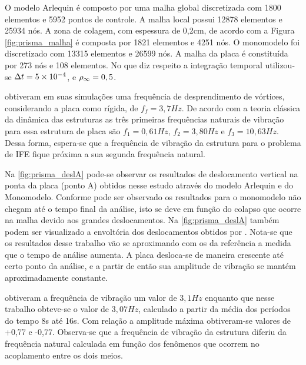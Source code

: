 O modelo Arlequin é composto por uma malha global discretizada com 1800 elementos e 5952 pontos de controle. A malha local possui 12878 elementos e 25934 nós. A zona de colagem, com espessura de 0,2cm, de acordo com a Figura \ref{fig:prisma_malha} é composta por 1821 elementos e 4251 nós.  O monomodelo foi discretizado com 13315 elementos e 26599 nós. A malha da placa é constituída por 273 nós e 108 elementos. No que diz respeito a integração temporal utilizou-se $\Delta t = 5\times10^{-4}$, e $\rho_\infty = 0,5$.

 obtiveram em suas simulações uma frequência de desprendimento de vórtices, considerando a placa como rígida, de $f_f = 3,7Hz$. De acordo com a teoria clássica da dinâmica das estruturas as três primeiras frequências naturais de vibração para essa estrutura de placa são $f_1 = 0,61Hz$, $f_2 = 3,80Hz$ e $f_3 = 10,63Hz$. Dessa forma, espera-se que a frequência de vibração da estrutura para o problema de IFE fique próxima a sua segunda frequência natural.

Na \autoref{fig:prisma_deslA} pode-se observar os resultados de deslocamento vertical na ponta da placa (ponto A) obtidos nesse estudo através do modelo Arlequin e do Monomodelo. Conforme pode ser observado os resultados para o monomodelo não chegam até o tempo final da análise, isto se deve em função do colapso que ocorre na malha devido aos grandes deslocamentos. Na \autoref{fig:prisma_deslA} também podem ser visualizado a envoltória dos deslocamentos obtidos por . Nota-se que os resultados desse trabalho vão se aproximando com os da referência a medida que o tempo de análise aumenta. A placa desloca-se de maneira crescente até certo ponto da análise, e a partir de então sua amplitude de vibração se mantém aproximadamente constante. 
 
 obtiveram a frequência de vibração um valor de $3,1Hz$ enquanto que nesse trabalho obteve-se o valor de $3,07Hz$, calculado a partir da média dos períodos do tempo 8s até 16s. Com relação a amplitude máxima obtiveram-se valores de +0,77 e -0,77. Observa-se que a frequência de vibração da estrutura diferiu da frequência natural calculada em função dos fenômenos que ocorrem no acoplamento entre os dois meios.

